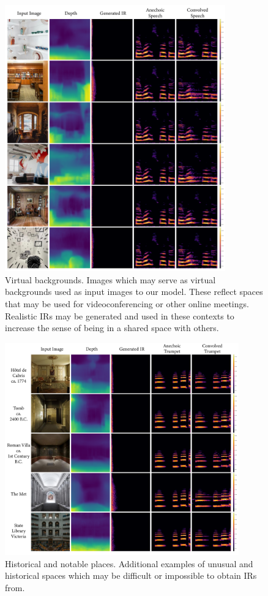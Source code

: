 \begin{figure}
    \centering
    \includegraphics[width=0.85\textwidth]{p_zoom.png}
    \caption{Virtual backgrounds. Images which may serve as virtual backgrounds used as input images to our model. These reflect spaces that may be used for videoconferencing or other online meetings. Realistic IRs may be generated and used in these contexts to increase the sense of being in a shared space with others.}
    \label{fig:p_zoom}
\end{figure}

\begin{figure}
    \centering
    \includegraphics[width=0.9\textwidth]{p_other.png}
    \caption{Historical and notable places. Additional examples of unusual and historical spaces which may be difficult or impossible to obtain IRs from.}
    \label{fig:p_other}
\end{figure}

